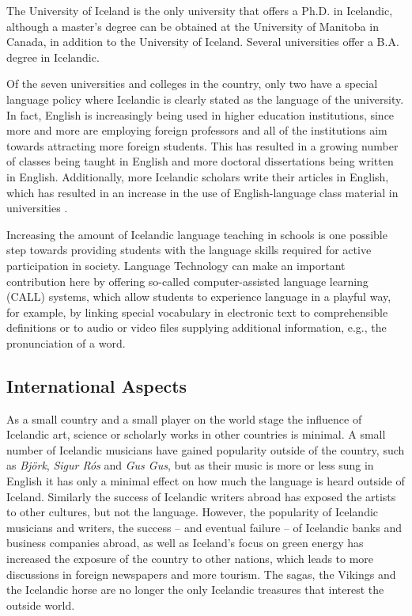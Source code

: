 \begin{multicols}{2}
The University of Iceland is the only university that offers a Ph.D. in Icelandic, although a master’s degree can be obtained at the University of Manitoba in Canada, in addition to the University of Iceland. Several universities offer a B.A. degree in Icelandic.

Of the seven universities and colleges in the country, only two have a special language policy where Icelandic is clearly stated as the language of the university. In fact, English is increasingly being used in higher education institutions, since more and more are employing foreign professors and all of the institutions aim towards attracting more foreign students. This has resulted in a growing number of classes being taught in English and more doctoral dissertations being written in English. Additionally, more Icelandic scholars write their articles in English, which has resulted in an increase in the use of English-language class material in universities \cite{isl1}. 


Increasing the amount of Icelandic language teaching in schools is one possible step towards providing students with the language skills required for active participation in society. Language Technology can make an important contribution here by offering so-called computer-assisted language learning (CALL) systems, which allow students to experience language in a playful way, for example, by linking special vocabulary in electronic text to comprehensible definitions or to audio or video files supplying additional information, e.g., the pronunciation of a word.

\subsection{International Aspects}

As a small country and a small player on the world stage the influence of Icelandic art, science or scholarly works in other countries is minimal. A small number of Icelandic musicians have gained popularity outside of the country, such as \textit{Björk}, \textit{Sigur Rós} and \textit{Gus Gus}, but as their music is more or less sung in English it has only a minimal effect on how much the language is heard outside of Iceland. Similarly the success of Icelandic writers abroad has exposed the artists to other cultures, but not the language. However, the popularity of Icelandic musicians and writers, the success -- and eventual failure -- of Icelandic banks and business companies abroad, as well as Iceland’s focus on green energy has increased the exposure of the country to other nations, which leads to more discussions in foreign newspapers and more tourism. The sagas, the Vikings and the Icelandic horse are no longer the only Icelandic treasures that interest the outside world.


\end{multicols}
